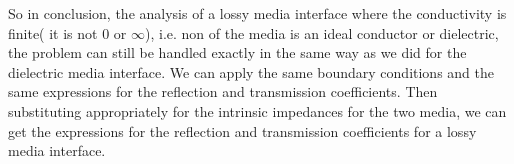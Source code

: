 So in conclusion, the analysis of a lossy media interface where the conductivity is finite( it is not 0 or $\infty$), i.e. non of the media is an ideal conductor or dielectric, the problem can still be handled exactly in the same way as we did for the dielectric media interface. We can apply the same boundary conditions and the same expressions for the reflection and transmission coefficients. Then substituting appropriately for the intrinsic impedances for the two media, we can get the expressions for the reflection and transmission coefficients for a lossy media interface. 
